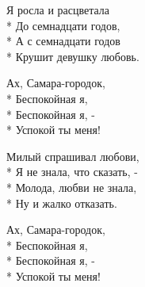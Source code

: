 \medskip

\begin{minipage}{\linewidth}
Я росла и расцветала\\*
До семнадцати годов,\\*
А с семнадцати годов\\*
Крушит девушку любовь.\\
\end{minipage}\par\medskip\nobreak

\medskip

\begin{minipage}{\linewidth}
\hspace*{1.5em}Ах, Самара-городок,\\*
\hspace*{1.5em}Беспокойная я,\\*
\hspace*{1.5em}Беспокойная я, - \\*
\hspace*{1.5em}Успокой ты меня!\\
\end{minipage}\par\medskip\nobreak

\medskip

\begin{minipage}{\linewidth}
Милый спрашивал любови,\\*
Я не знала, что сказать, - \\*
Молода, любви не знала,\\*
Ну и жалко отказать.\\
\end{minipage}\par\medskip\nobreak

\medskip

\begin{minipage}{\linewidth}
\hspace*{1.5em}Ах, Самара-городок,\\*
\hspace*{1.5em}Беспокойная я,\\*
\hspace*{1.5em}Беспокойная я, - \\*
\hspace*{1.5em}Успокой ты меня!\\
\end{minipage}\par\medskip\nobreak

\medskip

